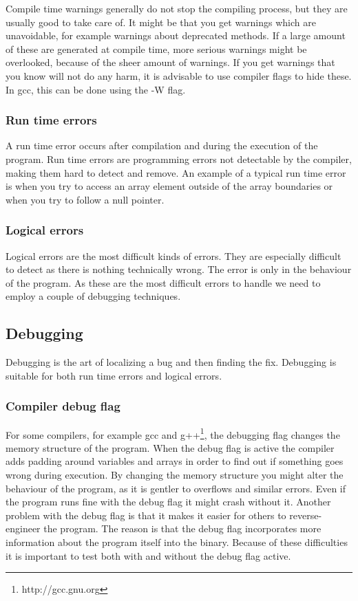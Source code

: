 \documentclass[11pt,a4paper,twoside]{article}
\begin{document}
Compile time warnings generally do not stop the compiling process, but they are
usually good to take care of. It might be that you get warnings which are
unavoidable, for example warnings about deprecated methods. If a large amount
of these are generated at compile time, more serious warnings might be
overlooked, because of the sheer amount of warnings. If you get warnings that
you know will not do any harm, it is advisable to use compiler flags to hide
these. In gcc, this can be done using the -W flag.

\subsubsection{Run time errors}

A run time error occurs after compilation and during the execution of the
program. Run time errors are programming errors not detectable by the compiler,
making them hard to detect and remove. An example of a typical run time error
is when you try to access an array element outside of the array boundaries or
when you try to follow a null pointer.

\subsubsection{Logical errors}

Logical errors are the most difficult kinds of errors. They are especially
difficult to detect as there is nothing technically wrong. The error is only in
the behaviour of the program. As these are the most difficult errors to handle
we need to employ a couple of debugging techniques.

\subsection{Debugging}

Debugging is the art of localizing a bug and then finding the fix. Debugging is
suitable for both run time errors and logical errors. 

\subsubsection{Compiler debug flag}

For some compilers, for example gcc and g++\footnote{http://gcc.gnu.org}, the
debugging flag changes the memory structure of the program. When the debug flag
is active the compiler adds padding around variables and arrays in order to
find out if something goes wrong during execution. By changing the memory
structure you might alter the behaviour of the program, as it is gentler to
overflows and similar errors.  Even if the program runs fine with the debug
flag it might crash without it.  Another problem with the debug flag is that it
makes it easier for others to reverse-engineer the program. The reason is that
the debug flag incorporates more information about the program itself into the
binary. Because of these difficulties it is important to test both with and
without the debug flag active.
\end{document}

